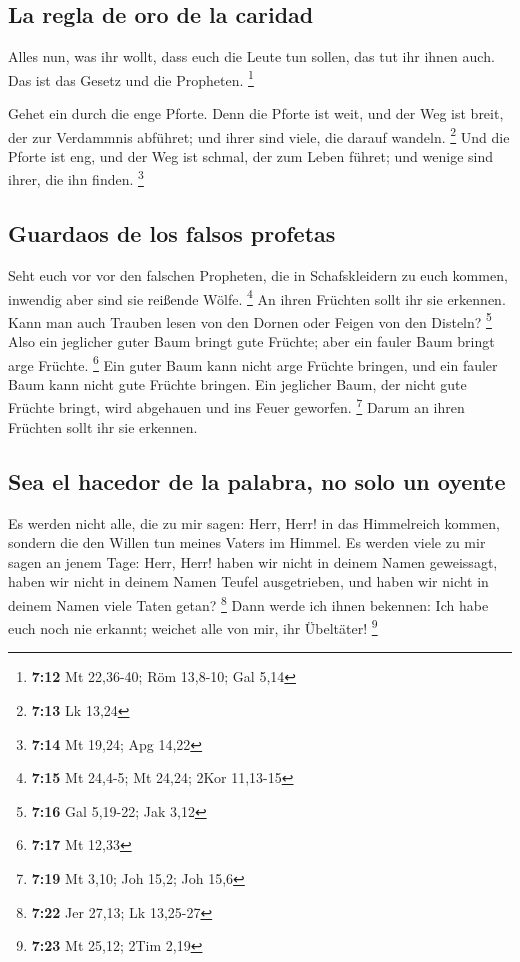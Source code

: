 \hypertarget{la-regla-de-oro-de-la-caridad}{%
\subsection{La regla de oro de la
caridad}\label{la-regla-de-oro-de-la-caridad}}

 Alles nun, was ihr wollt, dass euch die Leute tun
sollen, das tut ihr ihnen auch. Das ist das Gesetz und die Propheten.
\footnote{\textbf{7:12} Mt 22,36-40; Röm 13,8-10; Gal 5,14}

 Gehet ein durch die enge Pforte. Denn die Pforte ist
weit, und der Weg ist breit, der zur Verdammnis abführet; und ihrer sind
viele, die darauf wandeln. \footnote{\textbf{7:13} Lk 13,24}
 Und die Pforte ist eng, und der Weg ist schmal, der zum
Leben führet; und wenige sind ihrer, die ihn finden. \footnote{\textbf{7:14}
  Mt 19,24; Apg 14,22}

\hypertarget{guardaos-de-los-falsos-profetas}{%
\subsection{Guardaos de los falsos
profetas}\label{guardaos-de-los-falsos-profetas}}

 Seht euch vor vor den falschen Propheten, die in
Schafskleidern zu euch kommen, inwendig aber sind sie reißende Wölfe.
\footnote{\textbf{7:15} Mt 24,4-5; Mt 24,24; 2Kor 11,13-15}
 An ihren Früchten sollt ihr sie erkennen. Kann man auch
Trauben lesen von den Dornen oder Feigen von den Disteln? \footnote{\textbf{7:16}
  Gal 5,19-22; Jak 3,12}  Also ein jeglicher guter Baum
bringt gute Früchte; aber ein fauler Baum bringt arge Früchte.
\footnote{\textbf{7:17} Mt 12,33}  Ein guter Baum kann
nicht arge Früchte bringen, und ein fauler Baum kann nicht gute Früchte
bringen.  Ein jeglicher Baum, der nicht gute Früchte
bringt, wird abgehauen und ins Feuer geworfen. \footnote{\textbf{7:19}
  Mt 3,10; Joh 15,2; Joh 15,6}  Darum an ihren Früchten
sollt ihr sie erkennen.

\hypertarget{sea-el-hacedor-de-la-palabra-no-solo-un-oyente}{%
\subsection{Sea el hacedor de la palabra, no solo un
oyente}\label{sea-el-hacedor-de-la-palabra-no-solo-un-oyente}}

 Es werden nicht alle, die zu mir sagen: Herr, Herr! in
das Himmelreich kommen, sondern die den Willen tun meines Vaters im
Himmel.  Es werden viele zu mir sagen an jenem Tage:
Herr, Herr! haben wir nicht in deinem Namen geweissagt, haben wir nicht
in deinem Namen Teufel ausgetrieben, und haben wir nicht in deinem Namen
viele Taten getan? \footnote{\textbf{7:22} Jer 27,13; Lk 13,25-27}
 Dann werde ich ihnen bekennen: Ich habe euch noch nie
erkannt; weichet alle von mir, ihr Übeltäter! \footnote{\textbf{7:23} Mt
  25,12; 2Tim 2,19}

